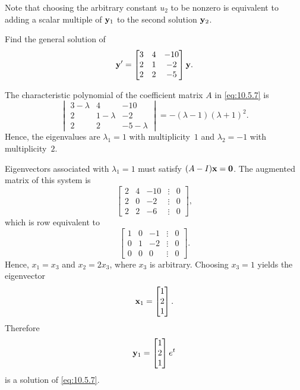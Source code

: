 \documentclass{ximera}
\begin{document}
Note that choosing the arbitrary constant $u_2$ to be nonzero is
equivalent to adding a scalar multiple of ${\bf y}_1$ to the second
solution ${\bf y}_2$. %

\begin{example}\label{example:10.5.3}
 Find the general solution of
\begin{equation}\label{eq:10.5.7}
{\bf y}'=\begin{bmatrix}3&4&-10\\2&1&-2\\2&2&-5\end{bmatrix} {\bf y}.
\end{equation}

\begin{explanation}  The characteristic polynomial of
the coefficient matrix $A$ in  \eqref{eq:10.5.7} is
$$
\begin{vmatrix} 3-\lambda & 4 & -10\\ 2 & 1-\lambda &
-2\\ 2 & 2 &-5-\lambda\end{vmatrix}=-
(\lambda-1)(\lambda+1)^2.
$$
Hence, the eigenvalues are $\lambda_1=1$ with multiplicity~$1$ and
$\lambda_2=-1$ with  multiplicity~$2$.

Eigenvectors associated with $\lambda_1=1$ must satisfy $(A-I){\bf x}={\bf 0}$. The augmented matrix of this system is
$$
\begin{bmatrix} 2 & 4 & -10 &\vdots & 0\\
2& 0 & -2 &\vdots & 0\\ 2 & 2 & -6 &
\vdots & 0\end{bmatrix}, $$
which is row equivalent to
$$
\begin{bmatrix} 1 & 0 & -1 &\vdots& 0\\  0 & 1 & -2
&\vdots& 0\\ 0 & 0 & 0 &\vdots&0\end{bmatrix}.
$$
Hence, $x_1 =x_3$ and  $x_2 =2 x_3$, where $x_3$ is arbitrary.
Choosing $x_3=1$ yields the eigenvector
$$
{\bf x}_1=\begin{bmatrix}1\\2\\1\end{bmatrix}.
$$
Therefore
$$
{\bf y}_1 =\begin{bmatrix}1\\2\\1\end{bmatrix}e^t
$$
is a solution of  \eqref{eq:10.5.7}.


\end{explanation}
\end{example}
\end{document}
